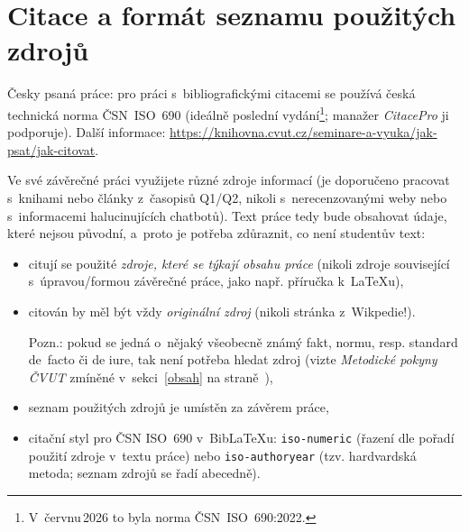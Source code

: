 \section{Citace a formát seznamu použitých zdrojů}\label{podkapZdroje}

Česky psaná práce: pro práci s~bibliografickými citacemi se používá  česká technická norma ČSN~ISO~690 (ideálně poslední vydání\footnote{V~červnu\,2026 to byla norma ČSN~ISO~690:2022.}; manažer \textit{CitacePro} ji podporuje). Další informace: \url{https://knihovna.cvut.cz/seminare-a-vyuka/jak-psat/jak-citovat}.
\par
Ve své závěrečné práci využijete různé zdroje informací (je doporučeno pracovat s~knihami nebo články z~časopisů Q1/Q2, nikoli s~nerecenzovanými weby nebo s~informacemi halucinujících chatbotů). Text práce tedy bude obsahovat údaje, které nejsou původní, a~proto je potřeba zdůraznit, co není studentův text:
\begin{itemize}
\item citují se použité {\em zdroje, které se týkají obsahu práce} (nikoli zdroje související s~úpravou/formou závěrečné práce, jako např. příručka k~\LaTeX u),
\item citován by měl být vždy {\em originální zdroj} (nikoli stránka z~Wikpedie!). \par Pozn.: pokud se jedná o~nějaký všeobecně známý fakt, normu, resp. standard de~facto či de iure, tak není potřeba hledat zdroj (vizte \textit{Metodické pokyny ČVUT} zmíněné v~sekci~\ref{obsah} na straně~\pageref{metodPokyny}),
\item seznam použitých zdrojů je umístěn za závěrem práce,
\item citační styl pro ČSN ISO~690 v~BibLaTeXu: \texttt{iso-numeric} (řazení dle pořadí použití zdroje v~textu práce) nebo \texttt{iso-authoryear} (tzv. hardvardská metoda; seznam zdrojů se řadí abecedně). %

\end{itemize}

